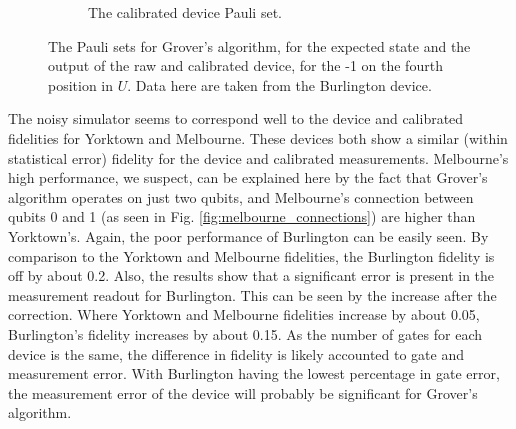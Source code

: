 \begin{figure}[h!]
\begin{subfigure}{.5\textwidth}
		\caption{The calibrated device Pauli set.}
		\label{fig:grov_pauli_cal}
	\end{subfigure}
	\caption{The Pauli sets for Grover's algorithm, for the expected state and the output of the raw and
		calibrated device, for the -1 on the fourth position in $U$.  Data here are taken from the Burlington device.}
	\label{fig:grover_paulis}
\end{figure}

The noisy simulator seems to correspond well to the device and calibrated
fidelities for Yorktown and Melbourne. These devices both show a similar (within
statistical error) fidelity for the device and calibrated measurements.
Melbourne's high performance, we suspect, can be explained here by the fact that
Grover's algorithm operates on just two qubits, and Melbourne's connection
between qubits 0 and 1 (as seen in Fig. \ref{fig:melbourne_connections}) are
higher than Yorktown's. Again, the poor performance of Burlington can be easily
seen. By comparison to the Yorktown and Melbourne fidelities, the Burlington
fidelity is off by about 0.2. Also, the results show that a significant error is
present in the measurement readout for Burlington. This can be seen by the
increase after the correction. Where Yorktown and Melbourne fidelities increase
by about 0.05, Burlington's fidelity increases by about 0.15. As the number of
gates for each device is the same, the difference in fidelity is likely
accounted to gate and measurement error. With Burlington having the lowest
percentage in gate error, the measurement error of the device will probably be
significant for Grover's algorithm.


